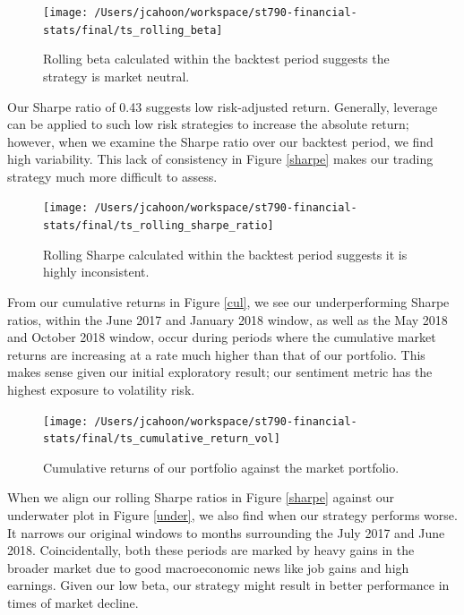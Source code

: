\documentclass[11,]{article}
\begin{document}
\begin{figure}

{\centering \texttt{[image: /Users/jcahoon/workspace/st790-financial-stats/final/ts\_rolling\_beta]} 

}

\caption{\label{beta}Rolling beta calculated within the backtest period suggests the strategy is market neutral.}\label{fig:unnamed-chunk-4}
\end{figure}

Our Sharpe ratio of 0.43 suggests low risk-adjusted return. Generally,
leverage can be applied to such low risk strategies to increase the
absolute return; however, when we examine the Sharpe ratio over our
backtest period, we find high variability. This lack of consistency in
Figure \ref{sharpe} makes our trading strategy much more difficult to
assess.

\begin{figure}

{\centering \texttt{[image: /Users/jcahoon/workspace/st790-financial-stats/final/ts\_rolling\_sharpe\_ratio]} 

}

\caption{\label{sharpe}Rolling Sharpe calculated within the backtest period suggests it is highly inconsistent.}\label{fig:unnamed-chunk-5}
\end{figure}

From our cumulative returns in Figure \ref{cul}, we see our
underperforming Sharpe ratios, within the June 2017 and January 2018
window, as well as the May 2018 and October 2018 window, occur during
periods where the cumulative market returns are increasing at a rate
much higher than that of our portfolio. This makes sense given our
initial exploratory result; our sentiment metric has the highest
exposure to volatility risk.

\begin{figure}

{\centering \texttt{[image: /Users/jcahoon/workspace/st790-financial-stats/final/ts\_cumulative\_return\_vol]} 

}

\caption{\label{cul}Cumulative returns of our portfolio against the market portfolio.}\label{fig:unnamed-chunk-6}
\end{figure}

When we align our rolling Sharpe ratios in Figure \ref{sharpe} against
our underwater plot in Figure \ref{under}, we also find when our
strategy performs worse. It narrows our original windows to months
surrounding the July 2017 and June 2018. Coincidentally, both these
periods are marked by heavy gains in the broader market due to good
macroeconomic news like job gains and high earnings. Given our low beta,
our strategy might result in better performance in times of market
decline.
\end{document}
